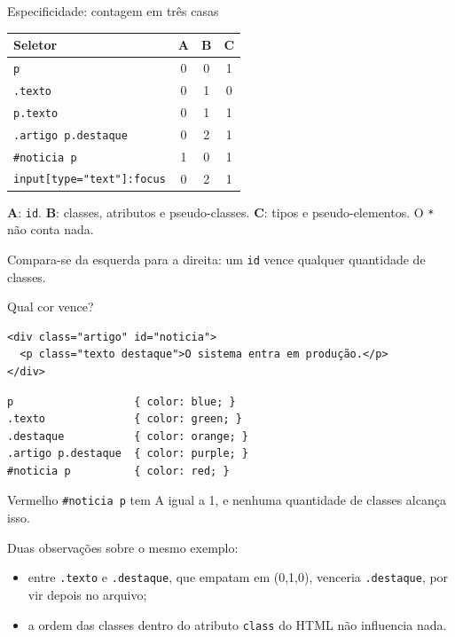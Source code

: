 \documentclass{beamer}
\begin{document}
\begin{frame}{Especificidade: contagem em três casas}
	\begin{center}
		\begin{tabular}{lccc}
			\toprule
			\textbf{Seletor}                  & \textbf{A} & \textbf{B} & \textbf{C} \\
			\midrule
			\texttt{p}                        & 0          & 0          & 1          \\
			\texttt{.texto}                   & 0          & 1          & 0          \\
			\texttt{p.texto}                  & 0          & 1          & 1          \\
			\texttt{.artigo p.destaque}       & 0          & 2          & 1          \\
			\texttt{\#noticia p}              & 1          & 0          & 1          \\
			\texttt{input[type="text"]:focus} & 0          & 2          & 1          \\
			\bottomrule
		\end{tabular}
	\end{center}

	\vspace{0.3cm}
	\textbf{A}: \texttt{id}. \textbf{B}: classes, atributos e pseudo-classes.
	\textbf{C}: tipos e pseudo-elementos. O \texttt{*} não conta nada.

	\vspace{0.2cm}
	Compara-se da esquerda para a direita: um \texttt{id} vence qualquer
	quantidade de classes.
\end{frame}

\begin{frame}[fragile]{Qual cor vence?}
	\begin{verbatim}
<div class="artigo" id="noticia">
  <p class="texto destaque">O sistema entra em produção.</p>
</div>
  \end{verbatim}

	\begin{verbatim}
p                   { color: blue; }
.texto              { color: green; }
.destaque           { color: orange; }
.artigo p.destaque  { color: purple; }
#noticia p          { color: red; }
  \end{verbatim}
\end{frame}

\begin{frame}{Vermelho}
	\texttt{\#noticia p} tem A igual a 1, e nenhuma quantidade de classes alcança
	isso.

	\vspace{0.5cm}
	Duas observações sobre o mesmo exemplo:

	\begin{itemize}
		\item entre \texttt{.texto} e \texttt{.destaque}, que empatam em (0,1,0),
		      venceria \texttt{.destaque}, por vir depois no arquivo;
		\item a ordem das classes dentro do atributo \texttt{class} do HTML não
		      influencia nada.
	\end{itemize}
\end{frame}
\end{document}
